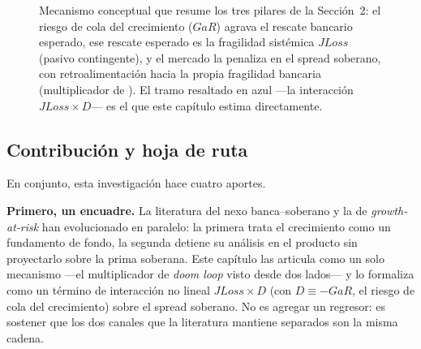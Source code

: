 \begin{figure}[t]
\centering
{}
\caption[Mecanismo conceptual: los tres pilares del marco teórico]{Mecanismo conceptual que resume los tres pilares de la Sección~2: el riesgo de cola del crecimiento ($GaR$) agrava el rescate bancario esperado, ese rescate esperado es la fragilidad sistémica $JLoss$ (pasivo contingente), y el mercado la penaliza en el spread soberano, con retroalimentación hacia la propia fragilidad bancaria (multiplicador de \citealp{FarhiTirole2018b}). El tramo resaltado en azul —la interacción $JLoss\times D$— es el que este capítulo estima directamente.}
\label{fig:mecanismo}
\end{figure}

\subsection{Contribución y hoja de ruta}

En conjunto, esta investigación hace cuatro aportes.

\textbf{Primero, un encuadre.} La literatura del nexo banca--soberano y la de \textit{growth-at-risk} han evolucionado en paralelo: la primera trata el crecimiento como un fundamento de fondo, la segunda detiene su análisis en el producto sin proyectarlo sobre la prima soberana. Este capítulo las articula como un solo mecanismo —el multiplicador de \textit{doom loop} visto desde dos lados— y lo formaliza como un término de interacción no lineal $JLoss\times D$ (con $D\equiv-GaR$, el riesgo de cola del crecimiento) sobre el spread soberano. No es agregar un regresor: es sostener que los dos canales que la literatura mantiene separados son la misma cadena.


